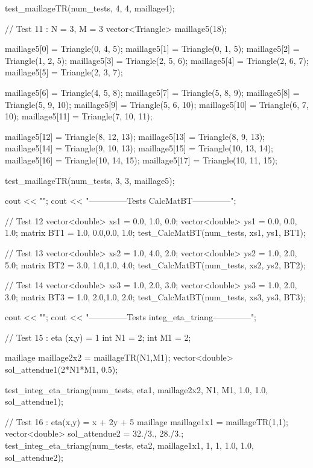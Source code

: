 \begin{codeblock}
{    test_maillageTR(num_tests, 4, 4, maillage4);


    // Test 11 : N = 3, M = 3
    vector<Triangle> maillage5(18);

    maillage5[0] = Triangle(0, 4, 5);
    maillage5[1] = Triangle(0, 1, 5);
    maillage5[2] = Triangle(1, 2, 5);
    maillage5[3] = Triangle(2, 5, 6);
    maillage5[4] = Triangle(2, 6, 7);
    maillage5[5] = Triangle(2, 3, 7);

    maillage5[6] = Triangle(4, 5, 8);
    maillage5[7] = Triangle(5, 8, 9);
    maillage5[8] = Triangle(5, 9, 10);
    maillage5[9] = Triangle(5, 6, 10);
    maillage5[10] = Triangle(6, 7, 10);
    maillage5[11] = Triangle(7, 10, 11);

    maillage5[12] = Triangle(8, 12, 13);
    maillage5[13] = Triangle(8, 9, 13);
    maillage5[14] = Triangle(9, 10, 13);
    maillage5[15] = Triangle(10, 13, 14);
    maillage5[16] = Triangle(10, 14, 15);
    maillage5[17] = Triangle(10, 11, 15);

    test_maillageTR(num_tests, 3, 3, maillage5);


    cout << "\n\n\n";
    cout << "--------------Tests CalcMatBT--------------\n";


    // Test 12
    vector<double> xs1 = {0.0, 1.0, 0.0};
    vector<double> ys1 = {0.0, 0.0, 1.0};
    matrix BT1 = {{1.0, 0.0},{0.0, 1.0}};
    test_CalcMatBT(num_tests, xs1, ys1, BT1);


    // Test 13
    vector<double> xs2 = {1.0, 4.0, 2.0};
    vector<double> ys2 = {1.0, 2.0, 5.0};
    matrix BT2 = {{3.0, 1.0},{1.0, 4.0}};
    test_CalcMatBT(num_tests, xs2, ys2, BT2);


    // Test 14
    vector<double> xs3 = {1.0, 2.0, 3.0};
    vector<double> ys3 = {1.0, 2.0, 3.0};
    matrix BT3 = {{1.0, 2.0},{1.0, 2.0}};
    test_CalcMatBT(num_tests, xs3, ys3, BT3);



    cout << "\n\n\n";
    cout << "--------------Tests integ_eta_triang--------------\n";


    // Test 15 : eta (x,y) = 1
    int N1 = 2;
    int M1 = 2;

    maillage maillage2x2 =   maillageTR(N1,M1);
    vector<double> sol_attendue1(2*N1*M1, 0.5);

    test_integ_eta_triang(num_tests, eta1, maillage2x2, N1, M1, 1.0, 1.0, sol_attendue1);


    // Test 16 : eta(x,y) = x + 2y + 5
    maillage maillage1x1 =   maillageTR(1,1);
    vector<double> sol_attendue2 = {32./3., 28./3.};
    test_integ_eta_triang(num_tests, eta2, maillage1x1, 1, 1, 1.0, 1.0, sol_attendue2);


}
\end{codeblock}
